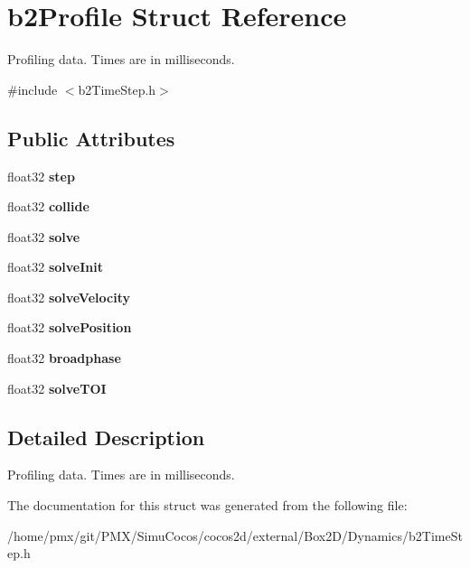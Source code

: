 \hypertarget{structb2Profile}{}\section{b2\+Profile Struct Reference}
\label{structb2Profile}


Profiling data. Times are in milliseconds.  




{\ttfamily \#include $<$b2\+Time\+Step.\+h$>$}

\subsection*{Public Attributes}
\begin{DoxyCompactItemize}
\item 
\mbox{\label{structb2Profile_a5b93de1d56902224868beacc478b9863}} 
float32 {\bfseries step}
\item 
\mbox{\label{structb2Profile_af827d9e54f7a4e94d0a023e18466b960}} 
float32 {\bfseries collide}
\item 
\mbox{\label{structb2Profile_afbefc05f05ec8bfd6cb2011929688a0b}} 
float32 {\bfseries solve}
\item 
\mbox{\label{structb2Profile_a010110900c27ccc88cd5e23b0e12e96e}} 
float32 {\bfseries solve\+Init}
\item 
\mbox{\label{structb2Profile_ae4d29a19b38de81621bccdbf75595233}} 
float32 {\bfseries solve\+Velocity}
\item 
\mbox{\label{structb2Profile_a78e22d104226863492ebab9ea30a9ed9}} 
float32 {\bfseries solve\+Position}
\item 
\mbox{\label{structb2Profile_a6bd556e43a6fa3853adad9fd71e56b44}} 
float32 {\bfseries broadphase}
\item 
\mbox{\label{structb2Profile_a74e8ea0c6ca39250d639ec94b69a803e}} 
float32 {\bfseries solve\+T\+OI}
\end{DoxyCompactItemize}


\subsection{Detailed Description}
Profiling data. Times are in milliseconds. 

The documentation for this struct was generated from the following file\+:\begin{DoxyCompactItemize}
\item 
/home/pmx/git/\+P\+M\+X/\+Simu\+Cocos/cocos2d/external/\+Box2\+D/\+Dynamics/b2\+Time\+Step.\+h\end{DoxyCompactItemize}
